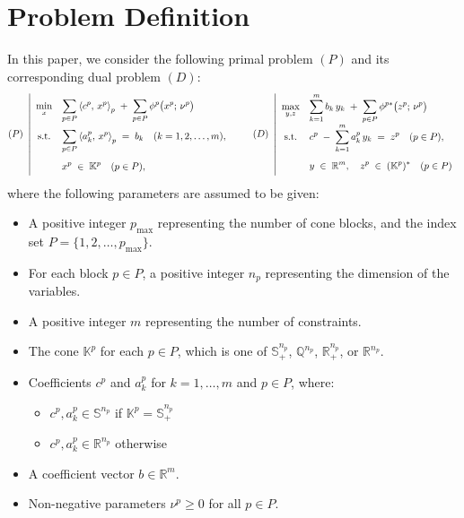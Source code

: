 \section{Problem Definition}

In this paper, we consider the following primal problem \((P)\) and its corresponding dual problem \((D)\):
\begin{equation*}
    \everymath{\displaystyle}
    \renewcommand{\arraystretch}{2.0}
    (P)~
    \left|
    \begin{array}{cl}
         \min_{x} & \displaystyle 
             \sum_{p \in P} \inprod{c^p}{x^p}_p 
             \;+\;\sum_{p \in P} \phi^p\bigl(x^p;\,\nu^p\bigr) \\[3pt]
         \text{s.t.} 
         & \displaystyle 
             \sum_{p \in P} \inprod{a^p_{k}}{x^p}_p 
             \;=\; b_k \quad (k= 1,2,\ldots,m), \\[3pt]
         & x^p \;\in\; \mathbb{K}^p \quad (p\in P),
    \end{array}
    \right.
    \qquad
    (D)~
    \left|
    \begin{array}{cl}
         \max_{y,z} & \displaystyle 
            \sum_{k=1}^m b_k\, y_k 
            \;+\;\sum_{p \in P} \phi^{p*}\bigl(z^p;\,\nu^p\bigr) \\[3pt]
         \text{s.t.} 
         & \displaystyle 
            c^p \;-\; \sum_{k=1}^m a^p_k\,y_k \;=\; z^p \quad (p\in P), \\[3pt]
         & y \;\in\; \mathbb{R}^m, \quad z^p \;\in\; (\mathbb{K}^p)^* \quad (p\in P)
    \end{array}
    \right.
\end{equation*}
where the following parameters are assumed to be given:
\begin{itemize}
    \item A positive integer $p_{\max}$ representing the number of cone blocks, and the index set $P = \{1, 2, \ldots, p_{\max}\}$.
    \item For each block $p \in P$, a positive integer $n_p$ representing the dimension of the variables.
    \item A positive integer $m$ representing the number of constraints.
    \item The cone $\mathbb{K}^p$ for each $p \in P$, which is one of $\mathbb{S}^{n_p}_+$, $\mathbb{Q}^{n_p}$, $\mathbb{R}^{n_p}_+$, or $\mathbb{R}^{n_p}$.
    \item Coefficients $c^p$ and $a^p_k$ for $k = 1, \ldots, m$ and $p \in P$, where:
      \begin{itemize}
          \item $c^p, a^p_k \in \mathbb{S}^{n_p}$ if $\mathbb{K}^p = \mathbb{S}^{n_p}_+$
          \item $c^p, a^p_k \in \mathbb{R}^{n_p}$ otherwise
      \end{itemize}
    \item A coefficient vector $b \in \mathbb{R}^m$.
    \item Non-negative parameters $\nu^p \ge 0$ for all $p \in P$.
\end{itemize}
